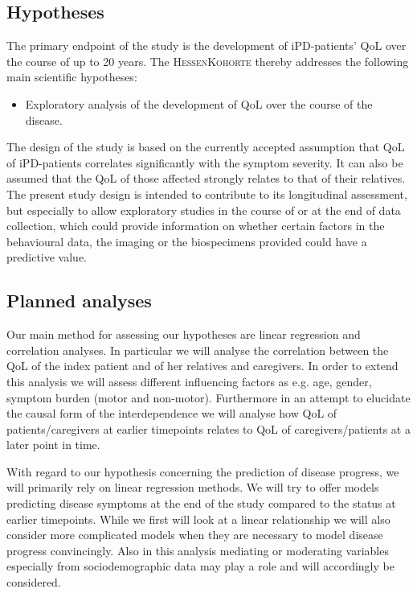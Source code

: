 \subsection{Hypotheses}
\label{sec:hypotheses}
The primary endpoint of the study is the development of \ac{iPD}-patients' \ac{QoL} over the course of up to 20 years. The \textsc{HessenKohorte} thereby addresses the following main scientific hypotheses:
\begin{itemize}
  \item Exploratory analysis of the development of \acl{QoL} over the course of the disease.
\end{itemize}
The design of the study is based on the currently accepted assumption that \ac{QoL} of \ac{iPD}-patients correlates significantly with the symptom severity. It can also be assumed that the \ac{QoL} of those affected strongly relates to that of their relatives. The present study design is intended to contribute to its longitudinal assessment, but especially to allow exploratory studies in the course of or at the end of data collection, which could provide information on whether certain factors in the behavioural data, the imaging or the biospecimens provided could have a predictive value.

\subsection{Planned analyses}
Our main method for assessing our hypotheses are linear regression and correlation analyses. In particular we will analyse the correlation between the \ac{QoL} of the index patient and of her relatives and caregivers. In order to extend this analysis we will assess different influencing factors as e.g. age, gender, symptom burden (motor and non-motor). Furthermore in an attempt to elucidate the causal form of the interdependence we will analyse how \ac{QoL} of patients/caregivers at earlier timepoints relates to \ac{QoL} of caregivers/patients at a later point in time.

With regard to our hypothesis concerning the prediction of disease progress, we will primarily rely on linear regression methods. We will try to offer models predicting disease symptoms at the end of the study compared to the status at earlier timepoints. While we first will look at a linear relationship we will also consider more complicated models when they are necessary to model disease progress convincingly. Also in this analysis mediating or moderating variables especially from sociodemographic data may play a role and will accordingly be considered.


